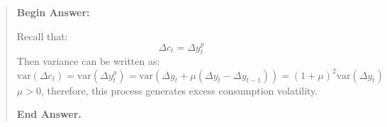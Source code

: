\begin{exercise}
\begin{enumerate}
\begin{quote}
{\bf Begin Answer: }

Recall that:
\begin{equation*}
\Delta c_t = \Delta y_t^p
\end{equation*}
Then variance can be written as:
\begin{equation*}
\text{var}(\Delta c_t) = \text{var}(\Delta y_t^p) = \text{var}(\Delta y_t + \mu (\Delta y_t-\Delta y_{t-1})) = (1+\mu)^2 \text{var}(\Delta y_t)
\end{equation*}
$\mu>0$, therefore, this process generates excess consumption volatility.

{\bf End Answer.}
\end{quote}
\end{enumerate}
\end{exercise} 



